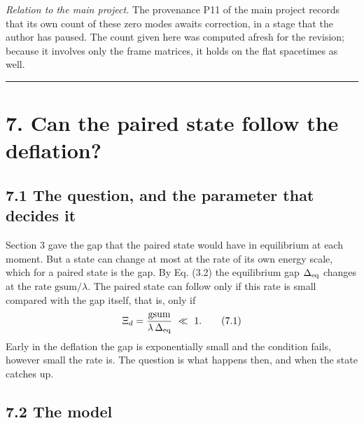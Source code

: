 \documentclass[
  10pt,
]{article}
\begin{document}
\emph{Relation to the main project.} The provenance P11 of the main
project records that its own count of these zero modes awaits
correction, in a stage that the author has paused. The count given here
was computed afresh for the revision; because it involves only the frame
matrices, it holds on the flat spacetimes as well.

\begin{center}\rule{0.5\linewidth}{0.5pt}\end{center}

\hypertarget{can-the-paired-state-follow-the-deflation}{%
\section{7. Can the paired state follow the
deflation?}\label{can-the-paired-state-follow-the-deflation}}

\hypertarget{the-question-and-the-parameter-that-decides-it}{%
\subsection{7.1 The question, and the parameter that decides
it}\label{the-question-and-the-parameter-that-decides-it}}

Section 3 gave the gap that the paired state would have in equilibrium
at each moment. But a state can change at most at the rate of its own
energy scale, which for a paired state is the gap. By Eq. (3.2) the
equilibrium gap \(\Delta_{\rm eq}\) changes at the rate
\(\mathrm{gsum}/\lambda\). The paired state can follow only if this rate
is small compared with the gap itself, that is, only if
\[\Xi_d=\frac{\mathrm{gsum}}{\lambda\,\Delta_{\rm eq}}\ \ll\ 1 .\tag{7.1}\]
Early in the deflation the gap is exponentially small and the condition
fails, however small the rate is. The question is what happens then, and
when the state catches up.

\hypertarget{the-model}{%
\subsection{7.2 The model}\label{the-model}}
\end{document}
